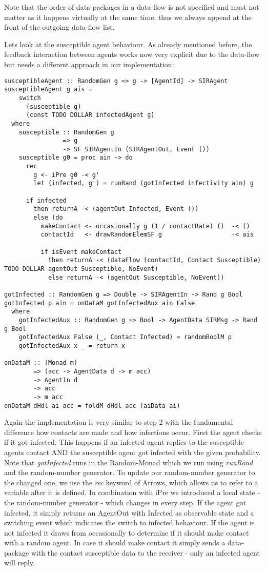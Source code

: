 Note that the order of data packages in a data-flow is not specified and must not matter as it happens virtually at the same time, thus we always append at the front of the outgoing data-flow list.

Lets look at the susceptible agent behaviour. As already mentioned before, the feedback interaction between agents works now very explicit due to the data-flow but needs a different approach in our implementation:

\begin{verbatim}
susceptibleAgent :: RandomGen g => g -> [AgentId] -> SIRAgent
susceptibleAgent g ais = 
    switch 
      (susceptible g) 
      (const TODO DOLLAR infectedAgent g)
  where
    susceptible :: RandomGen g 
                => g 
                -> SF SIRAgentIn (SIRAgentOut, Event ())
    susceptible g0 = proc ain -> do
      rec
        g <- iPre g0 -< g'
        let (infected, g') = runRand (gotInfected infectivity ain) g

      if infected 
        then returnA -< (agentOut Infected, Event ())
        else (do
          makeContact <- occasionally g (1 / contactRate) ()  -< ()
          contactId   <- drawRandomElemSF g                   -< ais

          if isEvent makeContact
            then returnA -< (dataFlow (contactId, Contact Susceptible) TODO DOLLAR agentOut Susceptible, NoEvent)
            else returnA -< (agentOut Susceptible, NoEvent))
            
gotInfected :: RandomGen g => Double -> SIRAgentIn -> Rand g Bool
gotInfected p ain = onDataM gotInfectedAux ain False
  where
    gotInfectedAux :: RandomGen g => Bool -> AgentData SIRMsg -> Rand g Bool
    gotInfectedAux False (_, Contact Infected) = randomBoolM p
    gotInfectedAux x _ = return x
    
onDataM :: (Monad m) 
        => (acc -> AgentData d -> m acc) 
        -> AgentIn d 
        -> acc 
        -> m acc
onDataM dHdl ai acc = foldM dHdl acc (aiData ai)
\end{verbatim}

Again the implementation is very similar to step 2 with the fundamental difference how contacts are made and how infections occur. First the agent checks if it got infected. This happens if an infected agent replies to the susceptible agents contact AND the susceptible agent got infected with the given probability. Note that \textit{gotInfected} runs in the Random-Monad which we run using \textit{runRand} and the random-number generator. To update our random-number generator to the changed one, we use the \textit{rec} keyword of Arrows, which allows us to refer to a variable after it is defined. In combination with iPre we introduced a local state - the random-number generator - which changes in every step.
If the agent got infected, it simply returns an AgentOut with Infected as observable state and a switching event which indicates the switch to infected behaviour.
If the agent is not infected it draws from occasionally to determine if it should make contact with a random agent. In case it should make contact it simply sends a data-package with the contact susceptible data to the receiver - only an infected agent will reply.


